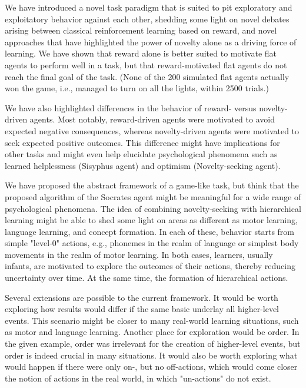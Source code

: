 \documentclass{article}
\begin{document}
We have introduced a novel task paradigm that is suited to pit exploratory and exploitatory behavior against each other, shedding some light on novel debates arising between classical reinforcement learning based on reward, and novel approaches that have highlighted the power of novelty alone as a driving force of learning. We have shown that reward alone is better suited to motivate flat agents to perform well in a task, but that reward-motivated flat agents do not reach the final goal of the task. (None of the 200 simulated flat agents actually won the game, i.e., managed to turn on all the lights, within 2500 trials.)

We have also highlighted differences in the behavior of reward- versus novelty-driven agents. Most notably, reward-driven agents were motivated to avoid expected negative consequences, whereas novelty-driven agents were motivated to seek expected positive outcomes. This difference might have implications for other tasks and might even help elucidate psychological phenomena such as learned helplessness (Sisyphus agent) and optimism (Novelty-seeking agent). 

We have proposed the abstract framework of a game-like task, but think that the proposed algorithm of the Socrates agent might be meaningful for a wide range of psychological phenomena. The idea of combining novelty-seeking with hierarchical learning might be able to shed some light on areas as different as motor learning, language learning, and concept formation. In each of these, behavior starts from simple "level-0" actions, e.g., phonemes in the realm of language or simplest body movements in the realm of motor learning. In both cases, learners, usually infants, are motivated to explore the outcomes of their actions, thereby reducing uncertainty over time. At the same time, the formation of hierarchical actions. 

Several extensions are possible to the current framework. It would be worth exploring how results would differ if the same basic underlay all higher-level events. This scenario might be closer to many real-world learning situations, such as motor and language learning. Another place for exploration would be order. In the given example, order was irrelevant for the creation of higher-level events, but order is indeed crucial in many situations. It would also be worth exploring what would happen if there were only on-, but no off-actions, which would come closer the notion of actions in the real world, in which "un-actions" do not exist. 
\end{document}

